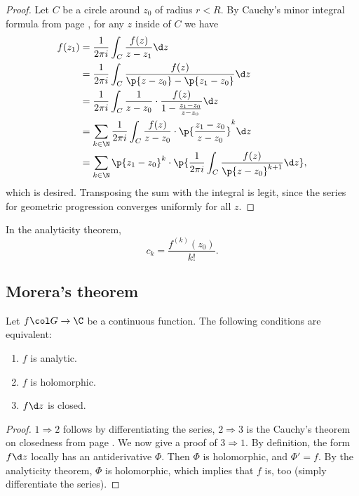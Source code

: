 \begin{proof}
  Let $C$ be a circle around $z_0$ of radius $r < R$.
  By Cauchy's minor integral formula from page \pageref{Cauchy, minor integral formula}, for any $z$ inside of $C$ we have
  \begin{align*}
    f(z_1)
    &= \frac{1}{2\pi i} \int_C \frac{f(z)}{z-z_1} \d z \\
    &= \frac{1}{2\pi i} \int_C \frac{f(z)}{\p{z-z_0}-\p{z_1-z_0}} \d z \\
    &= \frac{1}{2\pi i} \int_C \frac{1}{z-z_0} \cdot \frac{f(z)}{1-\frac{z_1-z_0}{z-z_0}} \d z \\
    &= \sum_{k\in \N} \frac{1}{2\pi i} \int_C \frac{f(z)}{z-z_0} \cdot \p{\frac{z_1-z_0}{z-z_0}}^k \d z \\
    &= \sum_{k\in \N} \p{z_1-z_0}^k \cdot \p{ \frac{1}{2\pi i} \int_C \frac{f(z)}{\p{z-z_0}^{k+1}} \d z },
  \end{align*}
  which is desired.
  Transposing the sum with the integral is legit, since the series for geometric progression converges uniformly for all $z$.
\end{proof}

\begin{remark}
  In the analyticity theorem,
  $$ c_k = \frac{f^{(k)}(z_0)}{k!}. $$
\end{remark}

\subsection{Morera's theorem}

\begin{corollary}
  Let $f \col G \to \C$ be a continuous function.
  The following conditions are equivalent:
  \begin{enumerate}
    \item $f$ is analytic.
    \item $f$ is holomorphic.
    \item $f \d z$ is closed. 
  \end{enumerate}
\end{corollary}


\begin{proof}
  $1 \Rightarrow 2$ follows by differentiating the series, $2 \Rightarrow 3$ is the Cauchy's theorem on closedness from page \pageref{Cauchy, on closedness}. We now give a proof of $3 \Rightarrow 1$. By definition, the form $f \d z$ locally has an antiderivative $\Phi$. Then $\Phi$ is holomorphic, and $\Phi' = f$. By the analyticity theorem, $\Phi$ is holomorphic, which implies that $f$ is, too (simply differentiate the series). 
\end{proof}

